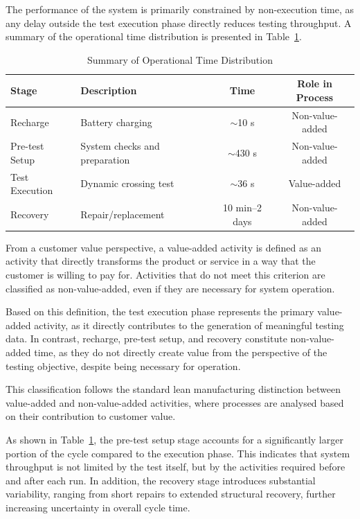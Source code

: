 The performance of the system is primarily constrained by non-execution time, as any delay outside the test execution phase directly reduces testing throughput. A summary of the operational time distribution is presented in Table~\ref{tab:operation_time}.

\begin{table}[H]
\centering
\small
\renewcommand{\arraystretch}{1.5}

\caption{Summary of Operational Time Distribution}
\label{tab:operation_time}

\begin{tabularx}{\textwidth}{l X c c}
\toprule
Stage & Description & Time & Role in Process \\
\midrule
Recharge & Battery charging & $\sim$10 s & Non-value-added \\
Pre-test Setup & System checks and preparation & $\sim$430 s & Non-value-added \\
Test Execution & Dynamic crossing test & $\sim$36 s & Value-added \\
Recovery & Repair/replacement & 10 min--2 days & Non-value-added \\
\bottomrule
\end{tabularx}
\end{table}

From a customer value perspective, a value-added activity is defined as an activity that directly transforms the product or service in a way that the customer is willing to pay for. Activities that do not meet this criterion are classified as non-value-added, even if they are necessary for system operation.\cite{value_added}

Based on this definition, the test execution phase represents the primary value-added activity, as it directly contributes to the generation of meaningful testing data. In contrast, recharge, pre-test setup, and recovery constitute non-value-added time, as they do not directly create value from the perspective of the testing objective, despite being necessary for operation.

This classification follows the standard lean manufacturing distinction between value-added and non-value-added activities, where processes are analysed based on their contribution to customer value.

As shown in Table~\ref{tab:operation_time}, the pre-test setup stage accounts for a significantly larger portion of the cycle compared to the execution phase. This indicates that system throughput is not limited by the test itself, but by the activities required before and after each run. In addition, the recovery stage introduces substantial variability, ranging from short repairs to extended structural recovery, further increasing uncertainty in overall cycle time.

